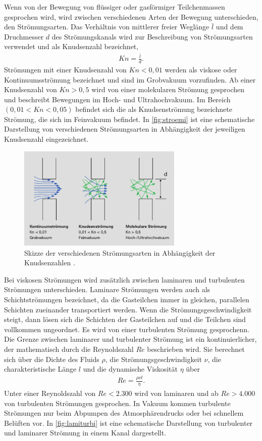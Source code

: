 Wenn von der Bewegung von flüssiger oder gasförmiger Teilchenmassen gesprochen wird, wird zwischen verschiedenen Arten der Bewegung unterschieden, den Strömungsarten. Das Verhältnis 
von mittlerer freier Weglänge $\bar l$ und dem Druchmesser $d$ des Strömungskanals wird zur Beschreibung von Strömungsarten verwendet und als Knudsenzahl bezeichnet,
\begin{align}
    Kn = \frac{\bar l}{d}.
\end{align}
Strömungen mit einer Knudsenzahl von $Kn < 0,01$ werden als viskose oder Kontinuumsströmung bezeichnet und sind im Grobvakuum vorzufinden. Ab einer Knudsenzahl von $Kn > 0,5$ wird 
von einer molekularen Strömung gesprochen und beschreibt Bewegungen im Hoch- und Ultrahochvakuum. Im Bereich 
$(0,01 < Kn < 0,05)$ befindet sich die als Knudsenströmung bezeichnete Strömung, die sich im Feinvakuum befindet. In \autoref{fig:stroemi} ist eine schematische Darstellung von verschiedenen Strömungsarten in Abhängigkeit der jeweiligen Knudsenzahl
eingezeichnet.
\begin{figure}[H]
    \centering
    \includegraphics[width=0.7\textwidth]{data/stroemungen.png}
    \caption{Skizze der verschiedenen Strömungsarten in Abhängigkeit der Knudsenzahlen \cite{EinfuehrungVakuum}.}
    \label{fig:stroemi}
\end{figure}

\noindent
Bei viskosen Strömungen wird zusätzlich zwischen laminaren und turbulenten Strömungen unterschieden. Laminare Strömungen werden auch als Schichtströmungen bezeichnet, da die Gasteilchen immer in gleichen, parallelen Schichten
zueinander transportiert werden. Wenn die Strömungsgeschwindigkeit steigt, dann lösen sich die Schichten der Gasteilchen auf und die Teilchen sind vollkommen ungeordnet. Es wird von einer turbulenten Strömung gesprochenn.
Die Grenze zwischen laminarer und turbulenter Strömung ist ein kontinuierlicher, der mathematisch durch die Reynoldszahl $Re$ beschrieben wird. Sie berechnet sich über die Dichte des Fluids $\rho$, die Strömungsgeschwindigkeit $\nu$,
die charakteristische Länge $l$ und die dynamische Viskosität $\eta$ über
\begin{align}
    Re= \frac{\rho\nu l}{\eta}.
\end{align}
Unter einer Reynoldszahl von $Re< 2.300$ wird von laminaren und ab $Re>4.000$ von turbulenten Strömungen gesprochen. In Vakuum kommen turbulente Strömungen nur beim Abpumpen des Atmosphärendrucks oder bei schnellem Belüften vor.
In \autoref{fig:lamiturbi} ist eine schematische Darstellung von turbulenter und laminarer Strömung in einem Kanal dargestellt.

